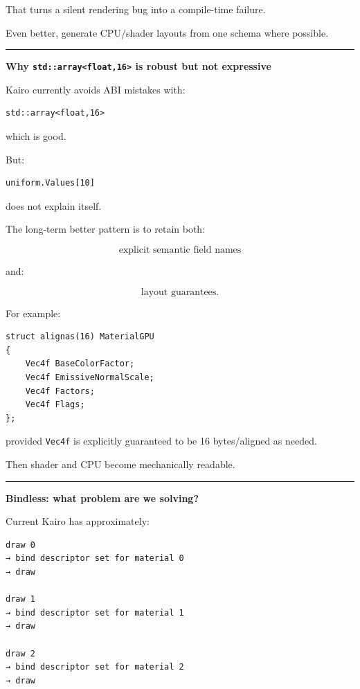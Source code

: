 That turns a silent rendering bug into a compile-time failure.

Even better, generate CPU/shader layouts from one schema where possible.

\begin{center}\rule{0.5\linewidth}{0.5pt}\end{center}

\textbf{Why \texttt{std::array\textless{}float,16\textgreater{}} is robust but not expressive}

Kairo currently avoids ABI mistakes with:

\begin{verbatim}
std::array<float,16>
\end{verbatim}

which is good.

But:

\begin{verbatim}
uniform.Values[10]
\end{verbatim}

does not explain itself.

The long-term better pattern is to retain both:

\[
\text{explicit semantic field names}
\]

and:

\[
\text{layout guarantees}.
\]

For example:

\begin{verbatim}
struct alignas(16) MaterialGPU
{
    Vec4f BaseColorFactor;
    Vec4f EmissiveNormalScale;
    Vec4f Factors;
    Vec4f Flags;
};
\end{verbatim}

provided \texttt{Vec4f} is explicitly guaranteed to be 16 bytes/aligned as needed.

Then shader and CPU become mechanically readable.

\begin{center}\rule{0.5\linewidth}{0.5pt}\end{center}

\textbf{Bindless: what problem are we solving?}

Current Kairo has approximately:

\begin{verbatim}
draw 0
→ bind descriptor set for material 0
→ draw

draw 1
→ bind descriptor set for material 1
→ draw

draw 2
→ bind descriptor set for material 2
→ draw
\end{verbatim}

